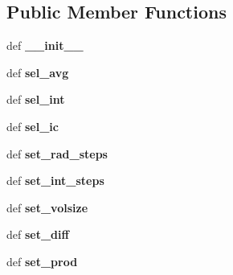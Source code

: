 \subsection*{Public Member Functions}
\begin{DoxyCompactItemize}
\item 
\hypertarget{classpyfrp__subwin_1_1sim__dialog_a144b65d6ee5f8ad7323ec28b9962ff07}{def {\bfseries \+\_\+\+\_\+init\+\_\+\+\_\+}}\label{classpyfrp__subwin_1_1sim__dialog_a144b65d6ee5f8ad7323ec28b9962ff07}

\item 
\hypertarget{classpyfrp__subwin_1_1sim__dialog_ad3403e20aa87699cb2f349b34a133c67}{def {\bfseries sel\+\_\+avg}}\label{classpyfrp__subwin_1_1sim__dialog_ad3403e20aa87699cb2f349b34a133c67}

\item 
\hypertarget{classpyfrp__subwin_1_1sim__dialog_a1edbd9375f9bfa25d6c22dad0f9056ce}{def {\bfseries sel\+\_\+int}}\label{classpyfrp__subwin_1_1sim__dialog_a1edbd9375f9bfa25d6c22dad0f9056ce}

\item 
\hypertarget{classpyfrp__subwin_1_1sim__dialog_a606c4e5212dc5404248a003e4a83c195}{def {\bfseries sel\+\_\+ic}}\label{classpyfrp__subwin_1_1sim__dialog_a606c4e5212dc5404248a003e4a83c195}

\item 
\hypertarget{classpyfrp__subwin_1_1sim__dialog_a797fd3deda531725f889730e06a5674a}{def {\bfseries set\+\_\+rad\+\_\+steps}}\label{classpyfrp__subwin_1_1sim__dialog_a797fd3deda531725f889730e06a5674a}

\item 
\hypertarget{classpyfrp__subwin_1_1sim__dialog_a56f42ea948e89f3423a383ffdc07cb12}{def {\bfseries set\+\_\+int\+\_\+steps}}\label{classpyfrp__subwin_1_1sim__dialog_a56f42ea948e89f3423a383ffdc07cb12}

\item 
\hypertarget{classpyfrp__subwin_1_1sim__dialog_a99ee039cbf83679162d49ba1d588f5de}{def {\bfseries set\+\_\+volsize}}\label{classpyfrp__subwin_1_1sim__dialog_a99ee039cbf83679162d49ba1d588f5de}

\item 
\hypertarget{classpyfrp__subwin_1_1sim__dialog_a7a15b8e5ff178b3de8c1864371e562e4}{def {\bfseries set\+\_\+diff}}\label{classpyfrp__subwin_1_1sim__dialog_a7a15b8e5ff178b3de8c1864371e562e4}

\item 
\hypertarget{classpyfrp__subwin_1_1sim__dialog_aa714bae65fc3f6060491d79f9f1d5aa7}{def {\bfseries set\+\_\+prod}}\label{classpyfrp__subwin_1_1sim__dialog_aa714bae65fc3f6060491d79f9f1d5aa7}


\end{DoxyCompactItemize}
